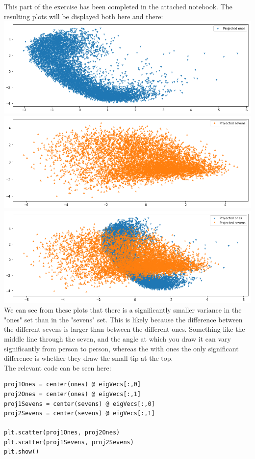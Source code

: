 This part of the exercise has been completed in the attached notebook. The resulting plots will be displayed both here and there:\\
\includegraphics[width=1\linewidth]{3b1.png}
\includegraphics[width=1\linewidth]{3b2.png}
\includegraphics[width=1\linewidth]{3b3.png}\\
We can see from these plots that there is a significantly smaller variance in the "ones" set than in the "sevens" set. This is likely because the difference between the different sevens is larger than between the different ones. Something like the middle line through the seven, and the angle at which you draw it can vary significantly from person to person, whereas the with ones the only significant difference is whether they draw the small tip at the top.\\
The relevant code can be seen here:
\begin{verbatim}
proj1Ones = center(ones) @ eigVecs[:,0]
proj2Ones = center(ones) @ eigVecs[:,1]
proj1Sevens = center(sevens) @ eigVecs[:,0]
proj2Sevens = center(sevens) @ eigVecs[:,1]

plt.scatter(proj1Ones, proj2Ones)
plt.scatter(proj1Sevens, proj2Sevens)
plt.show()
\end{verbatim}